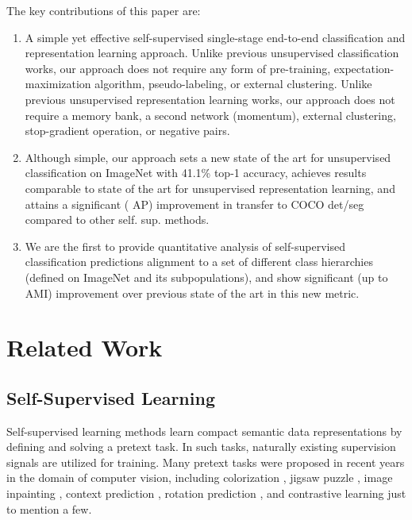 \documentclass[runningheads]{llncs}
\begin{document}
The key contributions of this paper are:
\begin{enumerate}
    \item A simple yet effective self-supervised single-stage end-to-end classification and representation learning approach. Unlike previous unsupervised classification works, our approach does not require any form of pre-training, expectation-maximization algorithm, pseudo-labeling, or external clustering. Unlike previous unsupervised representation learning works, our approach does not require a memory bank, a second network (momentum), external clustering, stop-gradient operation, or negative pairs.
    \item Although simple, our approach sets a new state of the art for unsupervised classification on ImageNet with 41.1\% top-1 accuracy, achieves results comparable to state of the art for unsupervised representation learning, and attains a significant ( AP) improvement in transfer to COCO det/seg compared to other self. sup. methods.
    \item We are the first to provide quantitative analysis of self-supervised classification predictions alignment to a set of different class hierarchies (defined on ImageNet and its subpopulations), and show significant (up to  AMI) improvement over previous state of the art in this new metric. 
\end{enumerate}



\section{Related Work}
\subsection{Self-Supervised Learning}
\label{section:self_supervised_learning}
Self-supervised learning methods learn compact semantic data representations by defining and solving a pretext task. In such tasks, naturally existing supervision signals are utilized for training. Many pretext tasks were proposed in recent years in the domain of computer vision, including colorization \cite{zhang2016colorful}, jigsaw puzzle \cite{noroozi2016unsupervised}, image inpainting \cite{pathak2016context}, context prediction \cite{doersch2015unsupervised}, rotation prediction \cite{DBLP:conf/iclr/GidarisSK18}, and contrastive learning \cite{wu2018unsupervised,dosovitskiy2014discriminative,DBLP:journals/corr/abs-2002-05709,chen2020big,he2020momentum,chen2020improved,caron2020unsupervised,misra2020self} just to mention a few.
\end{document}
